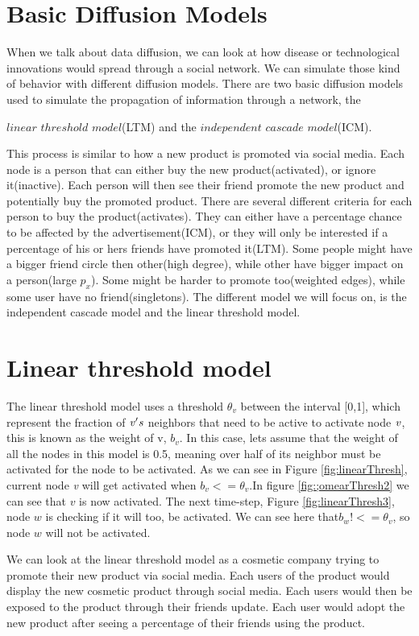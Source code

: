 \section{Basic Diffusion Models}
When we talk about data diffusion, we can look at how disease or technological innovations would spread through a social network. We can simulate those kind of behavior with different diffusion models. There are two basic diffusion models used to simulate the propagation of information through a network\cite{MaximizeSpread2003}, the {$linear$ $threshold$ $model$(LTM) and the $ independent$ $cascade$ $model$(ICM)\cite{MaximizeSpread2003}.

This process is similar to how a new product is promoted via social media. Each node is a person that can either buy the new product(activated), or ignore it(inactive). Each person will then see their friend promote the new product and potentially buy the promoted product. There are several different criteria for each person to buy the product(activates). They can either have a percentage chance to be affected by the advertisement(ICM), or they will only be interested if a percentage of his or hers friends have promoted it(LTM). Some people might have a bigger friend circle then other(high degree), while other have bigger impact on a person(large $p_x$). Some might be harder to promote too(weighted edges), while some user have no friend(singletons). The different model we will focus on, is the independent cascade model and the linear threshold model.

\section{Linear threshold model}
The linear threshold model uses a threshold $\theta_v$ between the interval [0,1], which represent the fraction of $\it{v}'s$ neighbors that need to be active to activate node $\it{v}$, this is known as the weight of v, $b_v$. In this case, lets assume that the weight of all the nodes in this model is 0.5, meaning over half of its neighbor must be activated for the node to be activated. As we can see in Figure \ref{fig:linearThresh}, current node {\it v} will get activated when $b_v <= \theta_v$.In figure \ref{fig:;omearThresh2} we can see that $v$ is now activated. The next time-step, Figure \ref{fig:linearThresh3}, node $w$ is checking if it will too, be activated. We can see here that$b_w !<= \theta_v$, so node $w$ will not be activated.  

We can look at the linear threshold model as a cosmetic company trying to promote their new product via social media. Each users of the product would display the new cosmetic product through social media. Each users would then be exposed to the product through their friends update. Each user would adopt the new product after seeing a percentage of their friends using the product. 

}
